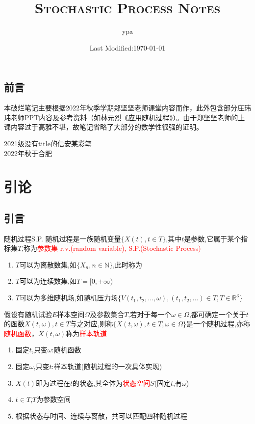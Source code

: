 \documentclass{elegantbook}
\title{\textsc{Stochastic Process Notes}}
\author{ypa}
\date{Last Modified:\today}
\begin{document}
\frontmatter
\section*{前言}
本破烂笔记主要根据2022年秋季学期郑坚坚老师课堂内容而作，此外包含部分庄玮玮老师PPT内容及参考资料（如林元烈《应用随机过程》）。由于郑坚坚老师的上课内容过于高雅不堪，故笔记省略了大部分的数学性很强的证明。
\begin{flushright}
    2021级没有title的信安某彩笔\\
    2022年秋于合肥
\end{flushright}
\tableofcontents

\mainmatter
\chapter{引论}
\section{引言}
\begin{definition}{随机过程}{S.P.}
    随机过程是一族随机变量$\{X(t),t\in T\}$,其中$t$是参数,它属于某个指标集$T$,称为\textcolor{red}{参数集}
    \qquad \textcolor{red}{r.v.(random variable), S.P.(Stochastic Process)}
\end{definition}
\begin{remark}
    \begin{enumerate}
        \item $T$可以为离散数集,如$\{X_n,n\in \mathbb{N}\}$,此时称为
        \item $T$可以为连续数集,如$T=[0,+\infty)$
        \item $T$可以为多维随机场,如随机压力场$\{V(t_1,t_2,\dots ,\omega),(t_1,t_2,\dots )\in T,T\in \mathbb{R}^{3}\}$
    \end{enumerate}
\end{remark}

\begin{definition}{}{}
    假设有随机试验$E$样本空间$\Omega$及参数集合$T$,若对于每一个$\omega \in \Omega$,都可确定一个关于$t$的函数$X(t,\omega),t\in T$与之对应,则称$\{X(t,\omega),t\in T,\omega \in \Omega\}$是一个随机过程,亦称\textcolor{red}{随机函数}，$X(t,\omega)$称为\textcolor{red}{样本轨道}
\end{definition}
\begin{remark}
    \begin{enumerate}
        \item 固定$t$,只变$\omega$:随机函数
        \item 固定$\omega$,只变$t$:样本轨道(随机过程的一次具体实现)
        \item $X(t)$即为过程在$t$的状态,其全体为\textcolor{red}{状态空间}$S$(固定$t$,有$\omega$)
        \item $t\in T$,$T$为参数空间
        \item 根据状态与时间、连续与离散，共可以匹配四种随机过程
    \end{enumerate}
\end{remark}
\end{document}
